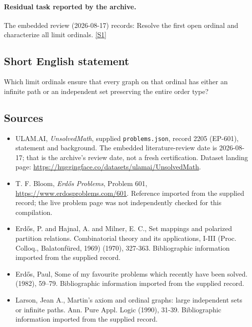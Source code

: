 \documentclass[11pt,a4paper]{article}
\newcommand{\sref}[2]{\hyperlink{source:#1:#2}{[S#2]}}
\begin{document}
\paragraph{Residual task reported by the archive.}

The embedded review (2026-08-17) records: Resolve the first open ordinal and characterize all limit ordinals. \sref{2205}{1}

\subsection{Short English statement}

Which limit ordinals ensure that every graph on that ordinal has either an infinite path or an independent set preserving the entire order type?

\subsection{Sources}

{\small

\begin{itemize}

\item[\hypertarget{source:2205:1}{S1}] ULAM.AI, \emph{UnsolvedMath}, supplied \texttt{problems.json}, record 2205 (EP-601), statement and background. The embedded literature-review date is 2026-08-17; that is the archive’s review date, not a fresh certification. Dataset landing page: \url{https://huggingface.co/datasets/ulamai/UnsolvedMath}.

\item[\hypertarget{source:2205:2}{S2}] T. F. Bloom, \emph{Erdős Problems}, Problem 601, \url{https://www.erdosproblems.com/601}. Reference imported from the supplied record; the live problem page was not independently checked for this compilation.

\item[\hypertarget{source:2205:3}{S3}] Erd\H{o}s, P. and Hajnal, A. and Milner, E. C., Set mappings and polarized partition relations. Combinatorial theory and its applications, I-III (Proc. Colloq., Balatonf\"{u}red, 1969) (1970), 327-363. Bibliographic information imported from the supplied record.

\item[\hypertarget{source:2205:4}{S4}] Erd\H{o}s, Paul, Some of my favourite problems which recently have been solved. (1982), 59--79. Bibliographic information imported from the supplied record.

\item[\hypertarget{source:2205:5}{S5}] Larson, Jean A., Martin's axiom and ordinal graphs: large independent sets or infinite paths. Ann. Pure Appl. Logic (1990), 31-39. Bibliographic information imported from the supplied record.

\end{itemize}

}

\label{end:2205}
\end{document}
